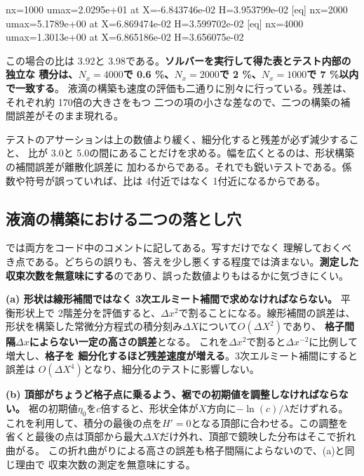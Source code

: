 \begin{plain}
  [eq] nx=1000 umax=2.0295e+01  at X=-6.843746e-02 H=3.953799e-02
  [eq] nx=2000 umax=5.1789e+00  at X=6.869474e-02 H=3.599702e-02
  [eq] nx=4000 umax=1.3013e+00  at X=6.865186e-02 H=3.656075e-02
\end{plain}

この場合の比は 3.92と 3.98である。\textbf{ソルバーを実行して得た表とテスト内部の独立な
積分は、$N_x = 4000$で 0.6 \%、$N_x = 2000$で 2 \%、$N_x = 1000$で 7 \%以内で一致する}。
液滴の構築も速度の評価も二通りに別々に行っている。残差は、それぞれ約 170倍の大きさをもつ
二つの項の小さな差なので、二つの構築の補間誤差がそのまま現れる。

テストのアサーションは上の数値より緩く、細分化すると残差が必ず減少すること、
比が 3.0と 5.0の間にあることだけを求める。幅を広くとるのは、形状構築の補間誤差が離散化誤差に
加わるからである。それでも鋭いテストである。係数や符号が誤っていれば、比は
4付近ではなく 1付近になるからである。

\subsection{液滴の構築における二つの落とし穴}

\begin{warn}[どちらも収束次数の測定を無意味にする]
  では両方をコード中のコメントに記してある。写すだけでなく
  理解しておくべき点である。どちらの誤りも、答えを少し悪くする程度では済まない。\textbf{測定した
  収束次数を無意味にする}のであり、誤った数値よりもはるかに気づきにくい。

  \textbf{(a) 形状は線形補間ではなく 3次エルミート補間で求めなければならない。}
  平衡形状上で 2階差分を評価すると、$\Delta x^{2}$で割ることになる。線形補間の誤差は、
  形状を構築した常微分方程式の積分刻み$\Delta X$について$O(\Delta X^{2})$であり、
  \textbf{格子間隔$\Delta x$によらない一定の高さの誤差}となる。
  これを$\Delta x^{2}$で割ると$\Delta x^{-2}$に比例して増大し、\textbf{格子を
  細分化するほど残差速度が増える}。3次エルミート補間にすると誤差は
  $O(\Delta X^{4})$となり、細分化のテストに影響しない。

  \textbf{(b) 頂部がちょうど格子点に乗るよう、裾での初期値を調整しなければならない。}
  裾の初期値$\eta_0$を$c$倍すると、形状全体が$X$方向に$-\ln(c)/\lambda$だけずれる。
  これを利用して、積分の最後の点を$H' = 0$となる頂部に合わせる。この調整を
  省くと最後の点は頂部から最大$\Delta X$だけ外れ、頂部で鏡映した分布はそこで折れ曲がる。
  この折れ曲がりによる高さの誤差も格子間隔によらないので、(a)と同じ理由で
  収束次数の測定を無意味にする。
\end{warn}

